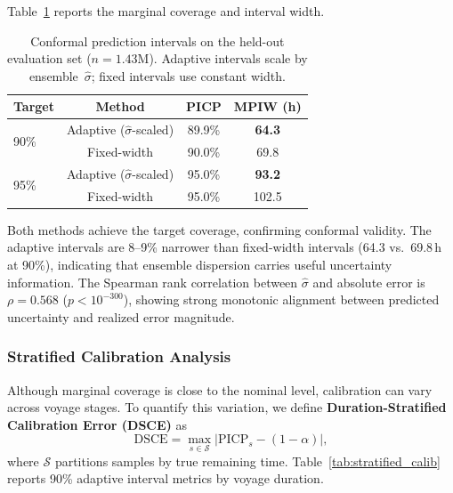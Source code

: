 \documentclass[sigconf,anonymous]{acmart}%
\begin{document}
Table~\ref{tab:conformal} reports the marginal coverage and interval width.

\begin{table}[t]
    \centering
    \caption{Conformal prediction intervals on the held-out evaluation set ($n=1.43$M). Adaptive intervals scale by ensemble~$\hat{\sigma}$; fixed intervals use constant width.}
    \label{tab:conformal}
    \begin{tabular}{lccc}
        \toprule
        \textbf{Target} & \textbf{Method} & \textbf{PICP} & \textbf{MPIW (h)} \\
        \midrule
        \multirow{2}{*}{90\%} & Adaptive ($\hat{\sigma}$-scaled) & 89.9\% & \textbf{64.3} \\
        & Fixed-width & 90.0\% & 69.8 \\
        \midrule
        \multirow{2}{*}{95\%} & Adaptive ($\hat{\sigma}$-scaled) & 95.0\% & \textbf{93.2} \\
        & Fixed-width & 95.0\% & 102.5 \\
        \bottomrule
    \end{tabular}
\end{table}

\noindent Both methods achieve the target coverage, confirming conformal validity. The adaptive intervals are 8--9\% narrower than fixed-width intervals (64.3 vs.\ 69.8\,h at 90\%), indicating that ensemble dispersion carries useful uncertainty information. The Spearman rank correlation between $\hat{\sigma}$ and absolute error is $\rho = 0.568$ ($p < 10^{-300}$), showing strong monotonic alignment between predicted uncertainty and realized error magnitude.

\subsubsection{Stratified Calibration Analysis}

Although marginal coverage is close to the nominal level, calibration can vary across voyage stages. To quantify this variation, we define \textbf{Duration-Stratified Calibration Error (DSCE)} as
\begin{equation}
    \text{DSCE} = \max_{s \in \mathcal{S}} \bigl|\text{PICP}_s - (1{-}\alpha)\bigr|,
\end{equation}
where $\mathcal{S}$ partitions samples by true remaining time. Table~\ref{tab:stratified_calib} reports 90\% adaptive interval metrics by voyage duration.
\end{document}
